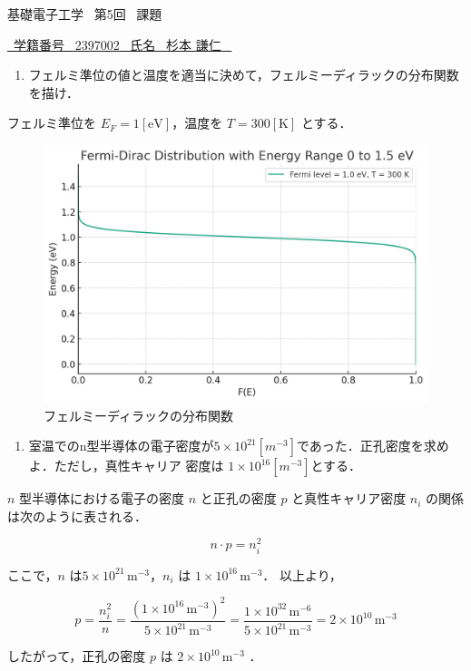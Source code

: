 \documentclass{classes/report}
\begin{document}
基礎電子工学 \ 第5回 \ 課題
\begin{flushright}
    \underline{\ 学籍番号 \ 2397002 \ 氏名 \ 杉本 謙仁 \ }
\end{flushright}

\bigskip

\begin{enumerate}
    \item フェルミ準位の値と温度を適当に決めて，フェルミーディラックの分布関数を描け．
\end{enumerate}

フェルミ準位を $E_F = 1 [\mathrm{eV}]$，温度を $T = 300 [\mathrm{K}]$ とする．

\begin{figure}[htbp]
    \centering
    \includegraphics[width=0.8\linewidth]{./figures/fermi-dirac.jpg}
    \caption{フェルミーディラックの分布関数}
\end{figure}

\bigskip

\begin{enumerate}[resume]
    \item 室温でのn型半導体の電子密度が$5\times 10^{21} [m^{-3}]$であった．正孔密度を求めよ．ただし，真性キャリア
    密度は $1\times 10^{16} [m^{-3}]$とする．
\end{enumerate}

\( n \) 型半導体における電子の密度 \( n \) と正孔の密度 \( p \) と真性キャリア密度 \( n_i \) の関係は次のように表される．

\[ n \cdot p = n_i^2 \]    

ここで，\( n \) は\( 5 \times 10^{21} \, \text{m}^{-3} \)，\( n_i \) は \( 1 \times 10^{16} \, \text{m}^{-3} \)．
以上より，

\[ p = \frac{n_i^2}{n} = \frac{(1 \times 10^{16} \, \text{m}^{-3})^2}{5 \times 10^{21} \, \text{m}^{-3}} = \frac{1 \times 10^{32} \, \text{m}^{-6}}{5 \times 10^{21} \, \text{m}^{-3}} = 2 \times 10^{10} \, \text{m}^{-3} \]

したがって，正孔の密度 \( p \) は \(2 \times 10^{10} \, \text{m}^{-3}\) ．
\end{document}
